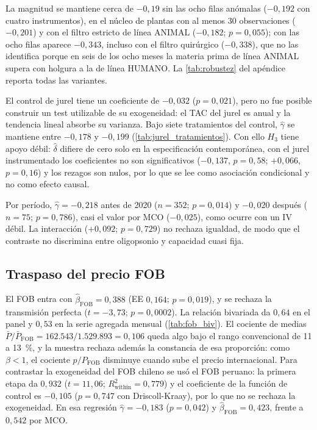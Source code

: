 \documentclass[11pt]{article}
\begin{document}
La magnitud se mantiene cerca de $-0{,}19$ sin las ocho filas anómalas ($-0{,}192$ con cuatro instrumentos), en el núcleo de plantas con al menos 30 observaciones ($-0{,}201$) y con el filtro estricto de línea ANIMAL ($-0{,}182$; $p=0{,}055$); con las ocho filas aparece $-0{,}343$, incluso con el filtro quirúrgico ($-0{,}338$), que no las identifica porque en seis de los ocho meses la materia prima de línea ANIMAL supera con holgura a la de línea HUMANO. La \autoref{tab:robustez} del apéndice reporta todas las variantes.

El control de jurel tiene un coeficiente de $-0{,}032$ ($p=0{,}021$), pero no fue posible construir un test utilizable de su exogeneidad: el TAC del jurel es anual y la tendencia lineal absorbe su varianza. Bajo siete tratamientos del control, $\hat\gamma$ se mantiene entre $-0{,}178$ y $-0{,}199$ (\autoref{tab:jurel_tratamientos}). Con ello $H_3$ tiene apoyo débil: $\hat\delta$ difiere de cero solo en la especificación contemporánea, con el jurel instrumentado los coeficientes no son significativos ($-0{,}137$, $p=0{,}58$; $+0{,}066$, $p=0{,}16$) y los rezagos son nulos, por lo que se lee como asociación condicional y no como efecto causal.

Por período, $\hat\gamma=-0{,}218$ antes de 2020 ($n=352$; $p=0{,}014$) y $-0{,}020$ después ($n=75$; $p=0{,}786$), casi el valor por MCO ($-0{,}025$), como ocurre con un IV débil. La interacción ($+0{,}092$; $p=0{,}729$) no rechaza igualdad, de modo que el contraste no discrimina entre oligopsonio y capacidad cuasi fija.

\subsection{Traspaso del precio FOB}\label{sec:fob}

El FOB entra con $\hat\beta_{\text{FOB}}=0{,}388$ (EE $0{,}164$; $p=0{,}019$), y se rechaza la transmisión perfecta ($t=-3{,}73$; $p=0{,}0002$). La relación bivariada da $0{,}64$ en el panel y $0{,}53$ en la serie agregada mensual (\autoref{tab:fob_biv}). El cociente de medias $\bar P/\bar P_{\text{FOB}}=162.543/1.529.893=0{,}106$ queda algo bajo el rango convencional de 11 a 13~\%, y la muestra rechaza además la constancia de esa proporción: como $\beta<1$, el cociente $p/P_{\text{FOB}}$ disminuye cuando sube el precio internacional. Para contrastar la exogeneidad del FOB chileno se usó el FOB peruano: la primera etapa da $0{,}932$ ($t=11{,}06$; $R^2_{\text{within}}=0{,}779$) y el coeficiente de la función de control es $-0{,}105$ ($p=0{,}747$ con Driscoll-Kraay), por lo que no se rechaza la exogeneidad. En esa regresión $\hat\gamma=-0{,}183$ ($p=0{,}042$) y $\hat\beta_{\text{FOB}}=0{,}423$, frente a $0{,}542$ por MCO.
\end{document}
